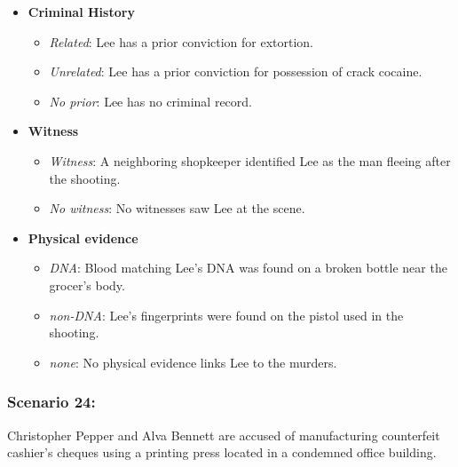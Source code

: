 \documentclass[
]{article}
\providecommand{\tightlist}{%
  \setlength{\itemsep}{0pt}\setlength{\parskip}{0pt}}
\begin{document}
\begin{itemize}
\tightlist
\item
  \textbf{Criminal History}

  \begin{itemize}
  \tightlist
  \item
    \emph{Related}: Lee has a prior conviction for extortion.
  \item
    \emph{Unrelated}: Lee has a prior conviction for possession of crack
    cocaine.
  \item
    \emph{No prior}: Lee has no criminal record.
  \end{itemize}
\item
  \textbf{Witness}

  \begin{itemize}
  \tightlist
  \item
    \emph{Witness}: A neighboring shopkeeper identified Lee as the man
    fleeing after the shooting.
  \item
    \emph{No witness}: No witnesses saw Lee at the scene.
  \end{itemize}
\item
  \textbf{Physical evidence}

  \begin{itemize}
  \tightlist
  \item
    \emph{DNA}: Blood matching Lee's DNA was found on a broken bottle
    near the grocer's body.
  \item
    \emph{non-DNA}: Lee's fingerprints were found on the pistol used in
    the shooting.
  \item
    \emph{none}: No physical evidence links Lee to the murders.
  \end{itemize}
\end{itemize}

\hypertarget{scenario-24}{%
\subsubsection{Scenario 24:}\label{scenario-24}}

Christopher Pepper and Alva Bennett are accused of manufacturing
counterfeit cashier's cheques using a printing press located in a
condemned office building.
\end{document}

